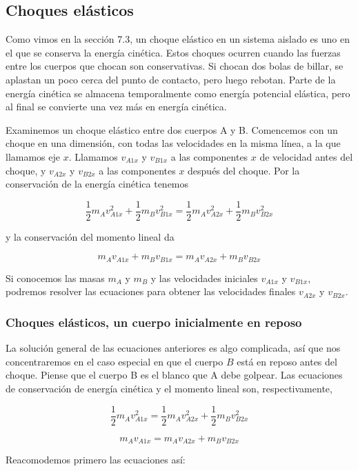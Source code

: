 \documentclass{article}
\newcommand{\newsubsection}[1]{
    \vspace{0.5cm}
    \color{sectionColor}
    \subsection{ #1}
    \color{black}
    \vspace{0.5cm}
}
\newcommand{\newtitle}[1]{
    \color{titleColor}
    \subsubsection{\textbf{#1}}
    \color{black}
}
\begin{document}
    \newsubsection{Choques elásticos}

    \par Como vimos en la sección 7.3, un choque elástico en un sistema aislado es uno en el que se conserva la energía cinética. Estos choques ocurren cuando las fuerzas entre los cuerpos que chocan son conservativas. Si chocan dos bolas de billar, se aplastan un poco cerca del punto de contacto, pero luego rebotan. Parte de la energía cinética se almacena temporalmente como energía potencial elástica, pero al ﬁnal se convierte una vez más en energía cinética.

    \par Examinemos un choque elástico entre dos cuerpos A y B. Comencemos con un choque en una dimensión, con todas las velocidades en la misma línea, a la que llamamos eje $x$. Llamamos $v_{A1x}$ y $v_{B1x}$ a las componentes $x$ de velocidad antes del choque, y $v_{A2x}$ y $v_{B2x}$ a las componentes $x$ después del choque. Por la conservación de la energía cinética tenemos

    \[ \frac{1}{2} m_A v_{A1x}^2 + \frac{1}{2} m_B v_{B1x}^2 = \frac{1}{2} m_A v_{A2x}^2 + \frac{1}{2} m_B v_{B2x}^2 \]

    \par y la conservación del momento lineal da

    \[ m_A v_{A1x} + m_B v_{B1x} = m_A v_{A2x} + m_B v_{B2x} \]

    \par Si conocemos las masas $m_A$ y $m_B$ y las velocidades iniciales $v_{A1x}$ y $v_{B1x}$, podremos resolver las ecuaciones para obtener las velocidades ﬁnales $v_{A2x}$ y $v_{B2x}$.

    \newtitle{Choques elásticos, un cuerpo inicialmente en reposo}

    \par La solución general de las ecuaciones anteriores es algo complicada, así que nos concentraremos en el caso especial en que el cuerpo $B$ está en reposo antes del choque. Piense que el cuerpo B es el blanco que A debe golpear. Las ecuaciones de conservación de energía cinética y el momento lineal son, respectivamente,

    \[ \frac{1}{2} m_A v_{A1x}^2 = \frac{1}{2} m_A v_{A2x}^2 + \frac{1}{2} m_B v_{B2x}^2 \]

    \[ m_A v_{A1x} = m_A v_{A2x} + m_B v_{B2x} \]

    \par Reacomodemos primero las ecuaciones así:
\end{document}
